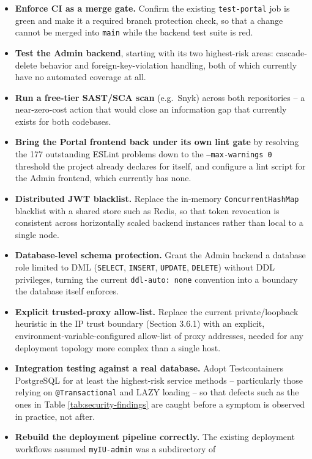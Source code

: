 \documentclass[12pt,a4paper]{report}
\begin{document}
\begin{itemize}
\item \textbf{Enforce CI as a merge gate.} Confirm the existing
\texttt{test-portal} job is green and make it a required branch
protection check, so that a change cannot be merged into \texttt{main}
while the backend test suite is red.
\item \textbf{Test the Admin backend}, starting with its two
highest-risk areas: cascade-delete behavior and foreign-key-violation
handling, both of which currently have no automated coverage at all.
\item \textbf{Run a free-tier SAST/SCA scan} (e.g.\ Snyk) across both
repositories -- a near-zero-cost action that would close an
information gap that currently exists for both codebases.
\item \textbf{Bring the Portal frontend back under its own lint gate}
by resolving the 177 outstanding ESLint problems down to the
\texttt{--max-warnings 0} threshold the project already declares for
itself, and configure a lint script for the Admin frontend, which
currently has none.
\item \textbf{Distributed JWT blacklist.} Replace the in-memory
\texttt{ConcurrentHashMap} blacklist with a shared store such as Redis,
so that token revocation is consistent across horizontally scaled
backend instances rather than local to a single node.
\item \textbf{Database-level schema protection.} Grant the Admin
backend a database role limited to DML (\texttt{SELECT},
\texttt{INSERT}, \texttt{UPDATE}, \texttt{DELETE}) without DDL
privileges, turning the current \texttt{ddl-auto: none} convention into
a boundary the database itself enforces.
\item \textbf{Explicit trusted-proxy allow-list.} Replace the current
private/loopback heuristic in the IP trust boundary (Section 3.6.1)
with an explicit, environment-variable-configured allow-list of proxy
addresses, needed for any deployment topology more complex than a
single host.
\item \textbf{Integration testing against a real database.} Adopt
Testcontainers PostgreSQL for at least the highest-risk service
methods -- particularly those relying on \texttt{@Transactional} and
LAZY loading -- so that defects such as the ones in Table
\ref{tab:security-findings} are caught before a symptom is observed in
practice, not after.
\item \textbf{Rebuild the deployment pipeline correctly.} The existing
deployment workflows assumed \texttt{myIU-admin} was a subdirectory of

\end{itemize}
\end{document}
